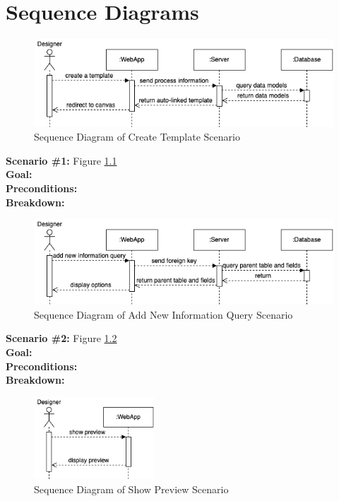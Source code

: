 \chapter{Sequence Diagrams}
\label{appendix:sequence_diagrams}
\begin{figure}[ht!]
    \centering
    \includegraphics[width=\textwidth]{overleaf/images/create_template.png}
    \caption{Sequence Diagram of Create Template Scenario}
    \label{fig:create_template}
\end{figure}

\noindent
\textbf{Scenario \#1:} Figure \ref{fig:create_template} \\
\textbf{Goal:} \\
\textbf{Preconditions:} \\
\textbf{Breakdown:} \\

\begin{figure}[ht!]
    \centering
    \includegraphics[width=\textwidth]{overleaf/images/add_new_information_query.png}
    \caption{Sequence Diagram of Add New Information Query Scenario}
    \label{fig:add_new_information_query}
\end{figure}

\noindent
\textbf{Scenario \#2:} Figure \ref{fig:add_new_information_query} \\
\textbf{Goal:} \\
\textbf{Preconditions:} \\
\textbf{Breakdown:} \\

\begin{figure}[ht!]
    \centering
    \includegraphics[width=0.4\textwidth]{overleaf/images/show_preview.png}
    \caption{Sequence Diagram of Show Preview Scenario}
    \label{fig:show_preview}
\end{figure}

